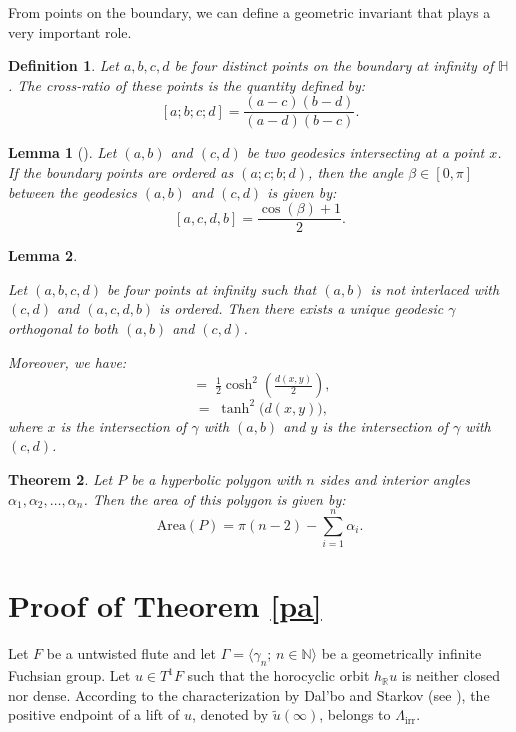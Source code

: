 \documentclass[11pt]{amsart}
\newtheorem{thm}{Theorem}[section]
\newtheorem{lem}{Lemma}[section]
\newtheorem{dfn}[thm]{Definition}
\begin{document}
From points on the boundary, we can define a geometric invariant that plays a very important role.
\begin{dfn}
Let \( a, b, c, d \) be four distinct points on the boundary at infinity of \( \mathbb{H} \).  
The \emph{cross-ratio} of these points is the quantity defined by:
\[
[a; b; c; d] = \frac{(a - c)(b - d)}{(a - d)(b - c)}.
\]
\end{dfn}

\begin{lem}[\cite{Beardon1983}]\label{QI}
Let \( (a, b) \) and \( (c, d) \) be two geodesics intersecting at a point \( x \).  
If the boundary points are ordered as \( (a; c; b; d) \), then the angle \( \beta \in [0, \pi] \) between the geodesics \( (a, b) \) and \( (c, d) \) is given by:
\[
[a, c, d, b] = \frac{\cos(\beta) + 1}{2}.
\]
\end{lem}
\begin{lem}\label{TAHA2}

Let $(a,b,c,d)$ be four points at infinity such that $(a,b)$ is not interlaced with $(c,d)$ and $(a,c,d,b)$ is ordered.  
Then there exists a unique geodesic $\gamma$ orthogonal to both $(a,b)$ and $(c,d)$.  

Moreover, we have:
\begin{equation}
  [a,c,d,b] \;=\; \tfrac{1}{2} \cosh^{2}\!\left(\tfrac{d(x,y)}{2}\right),
\end{equation}
\begin{equation}
  [a,b,c,d] \;=\; \tanh^{2}\!\bigl(d(x,y)\bigr),
\end{equation}
where $x$ is the intersection of $\gamma$ with $(a,b)$ and $y$ is the intersection of $\gamma$ with $(c,d)$.


\end{lem}
\begin{thm}\label{GB}
    Let \(P\) be a hyperbolic polygon with \(n\) sides and interior angles \(\alpha_{1}, \alpha_{2}, \ldots, \alpha_{n}\). Then the area of this polygon is given by:
    \[
    \text{Area}(P) = \pi(n - 2) - \sum_{i=1}^{n} \alpha_{i}.
    \]
\end{thm}

\section{Proof of Theorem \ref{pa}}

Let \( F \) be a untwisted flute and let \( \Gamma = \langle \gamma_n; \, n \in \mathbb{N} \rangle \) be a geometrically infinite Fuchsian group.  
Let \( u \in T^1F \) such that the horocyclic orbit \( h_{\mathbb{R}}u \) is neither closed nor dense.  
According to the characterization by Dal'bo and Starkov (see \cite{Starkov1995}), the positive endpoint of a lift of \( u \), denoted by \( \widetilde{u}(\infty) \), belongs to \( \Lambda_{\mathrm{irr}} \).  
\end{document}
